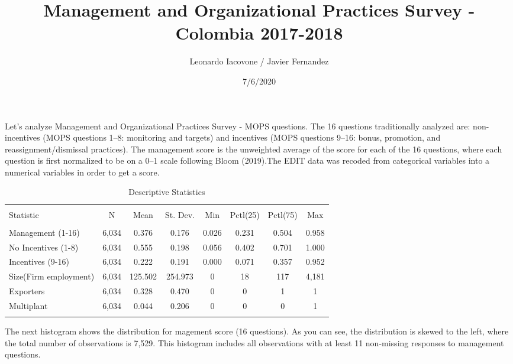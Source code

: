 \documentclass[]{article}
\title{Management and Organizational Practices Survey - Colombia 2017-2018}
\author{Leonardo Iacovone / Javier Fernandez}
\date{7/6/2020}
\begin{document}
\maketitle

Let's analyze Management and Organizational Practices Survey - MOPS
questions. The 16 questions traditionally analyzed are: non-incentives
(MOPS questions 1--8: monitoring and targets) and incentives (MOPS
questions 9--16: bonus, promotion, and reassignment/dismissal
practices). The management score is the unweighted average of the score
for each of the 16 questions, where each question is first normalized to
be on a 0--1 scale following Bloom (2019).The EDIT data was recoded from
categorical variables into a numerical variables in order to get a
score.

\begin{table}[!htbp] \centering 
  \caption{Descriptive Statistics} 
  \label{} 
\begin{tabular}{@{\extracolsep{5pt}}lccccccc} 
\\[-1.8ex]\hline 
\hline \\[-1.8ex] 
Statistic & \multicolumn{1}{c}{N} & \multicolumn{1}{c}{Mean} & \multicolumn{1}{c}{St. Dev.} & \multicolumn{1}{c}{Min} & \multicolumn{1}{c}{Pctl(25)} & \multicolumn{1}{c}{Pctl(75)} & \multicolumn{1}{c}{Max} \\ 
\hline \\[-1.8ex] 
Management (1-16) & 6,034 & 0.376 & 0.176 & 0.026 & 0.231 & 0.504 & 0.958 \\ 
No Incentives (1-8) & 6,034 & 0.555 & 0.198 & 0.056 & 0.402 & 0.701 & 1.000 \\ 
Incentives (9-16) & 6,034 & 0.222 & 0.191 & 0.000 & 0.071 & 0.357 & 0.952 \\ 
Size(Firm employment) & 6,034 & 125.502 & 254.973 & 0 & 18 & 117 & 4,181 \\ 
Exporters & 6,034 & 0.328 & 0.470 & 0 & 0 & 1 & 1 \\ 
Multiplant & 6,034 & 0.044 & 0.206 & 0 & 0 & 0 & 1 \\ 
\hline \\[-1.8ex] 
\end{tabular} 
\end{table}

The next histogram shows the distribution for magement score (16
questions). As you can see, the distribution is skewed to the left,
where the total number of observations is 7,529. This histogram includes
all observations with at least 11 non-missing responses to management
questions.
\end{document}
